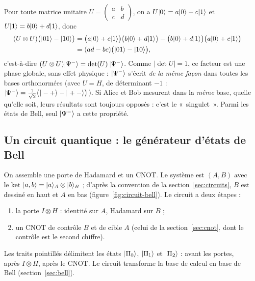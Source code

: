 \begin{remarque}\label{rem:singulet}
Pour toute matrice unitaire $U=\begin{pmatrix}a&b\\c&d\end{pmatrix}$, on a $U|0\rangle=a|0\rangle+c|1\rangle$
et $U|1\rangle=b|0\rangle+d|1\rangle$, donc
\begin{align*}
  (U\otimes U)\big(|01\rangle-|10\rangle\big)
  &=\big(a|0\rangle+c|1\rangle\big)\big(b|0\rangle+d|1\rangle\big)-\big(b|0\rangle+d|1\rangle\big)\big(a|0\rangle+c|1\rangle\big)\\
  &=(ad-bc)\big(|01\rangle-|10\rangle\big),
\end{align*}
c'est-à-dire $(U\otimes U)|\Psi^-\rangle=\det(U)\,|\Psi^-\rangle$. Comme $|\det U|=1$, ce facteur est une
phase globale, sans effet physique : $|\Psi^-\rangle$ s'écrit \emph{de la même façon} dans toutes les
bases orthonormées (avec $U=H$, de déterminant $-1$ : $|\Psi^-\rangle=\frac{1}{\sqrt2}\big(|-+\rangle-|+-\rangle\big)$).
Si Alice et Bob mesurent dans la \emph{même} base, quelle qu'elle soit, leurs résultats sont
toujours opposés : c'est le «~singulet~». Parmi les états de Bell, seul $|\Psi^-\rangle$ a cette propriété.
\end{remarque}

\subsection{Un circuit quantique : le générateur d'états de Bell}\label{sec:circuit-bell}

On assemble une porte de Hadamard et un CNOT. Le système est $(A,B)$ avec le ket
$|a,b\rangle=|a\rangle_A\otimes|b\rangle_B$ ; d'après la convention de la section~\ref{sec:circuits}, $B$ est dessiné
en haut et $A$ en bas (figure~\ref{fig:circuit-bell}). Le circuit a deux étapes :
\begin{enumerate}[nosep]
  \item la porte $I\otimes H$ : identité sur $A$, Hadamard sur $B$ ;
  \item un CNOT de contrôle $B$ et de cible $A$ (celui de la section~\ref{sec:cnot}, dont le
        contrôle est le second chiffre).
\end{enumerate}
Les traits pointillés délimitent les états $|\Pi_0\rangle$, $|\Pi_1\rangle$ et $|\Pi_2\rangle$ :
avant les portes, après $I\otimes H$, après le CNOT. Le circuit transforme la base de calcul
en base de Bell (section~\ref{sec:bell}).

